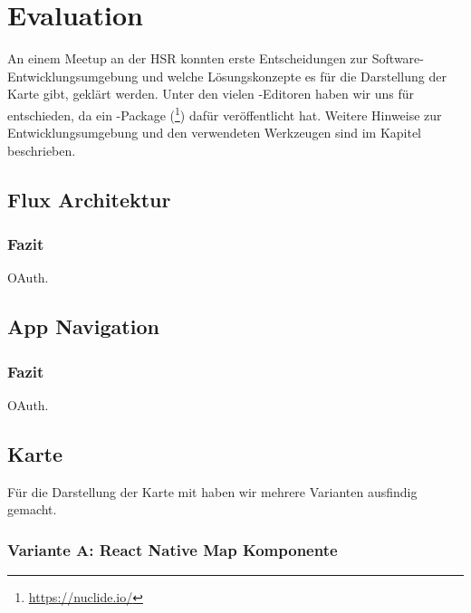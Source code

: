 \chapter{Evaluation}
\label{tb-evaluation}
An einem  Meetup an der HSR konnten erste Entscheidungen zur Software-Entwicklungsumgebung und welche Lösungskonzepte es für die Darstellung der Karte gibt, geklärt werden.
Unter den vielen -Editoren haben wir uns für  entschieden, da  ein -Package (\footnote{\url{https://nuclide.io/}}) dafür veröffentlicht hat. 
Weitere Hinweise zur Entwicklungsumgebung und den verwendeten Werkzeugen sind im Kapitel  beschrieben.


\section{Flux Architektur}

\subsection{Fazit}
OAuth.

\section{App Navigation}

\subsection{Fazit}
OAuth.

\section{Karte}
\label{tb-evaluation-karte}

Für die Darstellung der Karte mit  haben wir mehrere Varianten ausfindig gemacht.

\subsection{Variante A: React Native Map Komponente}

